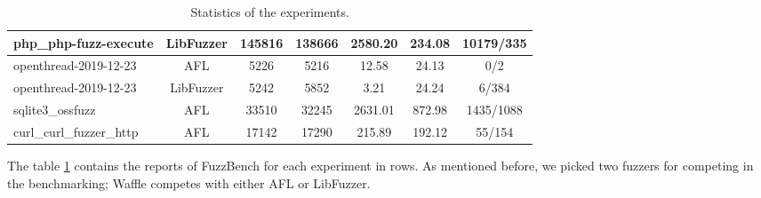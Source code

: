 \begin{table}[!t]
\begin{adjustbox}{angle=90}
{\begin{tabular}{|l|c|c|c|c|c|c|}
        \hline
        php\_php-fuzz-execute    & LibFuzzer & 145816                                                         & 138666                                                         & 2580.20                                              & 234.08                                               & 10179/335                                                         \\[2ex] 
        \hline
        openthread-2019-12-23    & AFL       & 5226                                                           & 5216                                                           & 12.58                                                & 24.13                                                & 0/2                                                               \\[2ex]
        \hline
        openthread-2019-12-23    & LibFuzzer & 5242                                                           & 5852                                                           & 3.21                                                 & 24.24                                                & 6/384                                                             \\[2ex]
        \hline
        sqlite3\_ossfuzz         & AFL       & 33510                                                          & 32245                                                          & 2631.01                                              & 872.98                                               & 1435/1088                                                         \\[2ex]
        \hline
        curl\_curl\_fuzzer\_http & AFL       & 17142                                                          & 17290                                                          & 215.89                                               & 192.12                                               & 55/154                                                            \\[2ex]
        \hline
        \end{tabular}}
    \end{adjustbox}
    \caption{Statistics of the experiments.}
    \label{fig:all}
\end{table}

The table \ref{fig:all} contains the reports of FuzzBench for each experiment in rows. As mentioned before, we picked two fuzzers for competing in the benchmarking; Waffle competes with either AFL or LibFuzzer.
